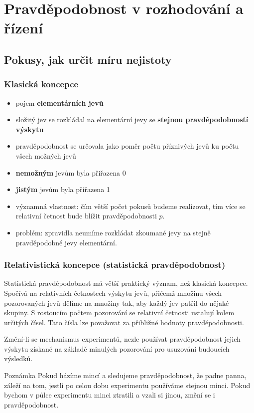 \chapter{Pravděpodobnost v rozhodování a řízení}
\section{Pokusy, jak určit míru nejistoty}
\subsection{Klasická koncepce}
	\begin{itemize}
		\item pojem \textbf{elementárních jevů}
		\item složitý jev se rozkládal na elementární jevy se \textbf{stejnou pravděpodobností výskytu}
		\item pravděpodobnost se určovala jako poměr počtu příznivých jevů ku počtu všech možných jevů
		\item \textbf{nemožným} jevům byla přiřazena 0
		\item \textbf{jistým} jevům byla přiřazena 1
		\item významná vlastnost: čím větší počet pokusů budeme realizovat, tím více se relativní četnost bude blížit pravděpodobnosti $p$.
		\item problém: zpravidla neumíme rozkládat zkoumané jevy na stejně pravděpodobné jevy elementární.
	\end{itemize}
	
\subsection{Relativistická koncepce (statistická pravděpodobnost)}
Statistická pravděpodobnost má větší praktický význam, než klasická koncepce. Spočívá na relativních četnostech výskytu jevů, přičemž množinu všech pozorovaných jevů dělíme na množiny tak, aby každý jev patřil do nějaké skupiny. S rostoucím počtem pozorování se relativní četnosti ustalují kolem určitých čísel. Tato čísla lze považovat za přibližné hodnoty pravděpodobnosti.\br
	
	Změní-li se mechanismus experimentů, nezle používat pravděpodobnost jejich výskytu získané na základě minulých pozorování pro usuzování budoucích výsledků.
	
	\begin{note}{Poznámka}
	Pokud házíme mincí a sledujeme pravděpodobnost, že padne panna, záleží na tom, jestli po celou dobu experimentu používáme stejnou minci. Pokud bychom v půlce experimentu minci ztratili a vzali si jinou, změní se i pravděpodobnost.
	\end{note}
	
